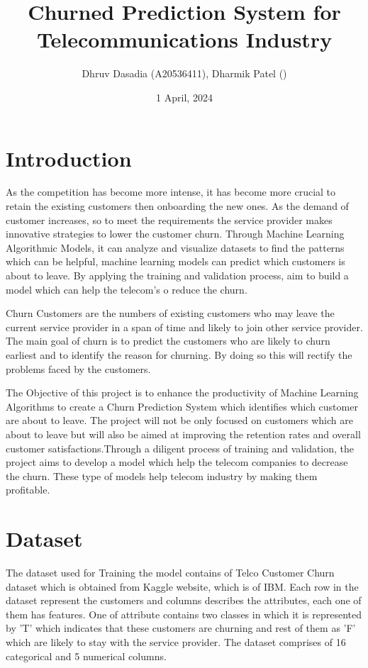 \documentclass{article}
\title{Churned Prediction System for Telecommunications Industry}
\author{Dhruv Dasadia (A20536411), Dharmik Patel ()}
\date{1 April, 2024}
\begin{document}
\maketitle

\section{Introduction}

\title{}

As the competition has become more intense, it has become more crucial to retain the existing customers then onboarding the new ones. As the demand of customer increases, so to meet the requirements the service provider makes innovative strategies to lower the customer churn. Through Machine Learning Algorithmic Models, it can analyze and visualize datasets to find the patterns which can be helpful, machine learning models can predict which customers is about to leave. By applying the training and validation process, aim to build a model which can help the telecom’s o reduce the churn.

Churn Customers are the numbers of existing customers who may leave the current service provider in a span of time and likely to join other service provider. The main goal of churn is to predict the customers who are likely to churn earliest and to identify the reason for churning. By doing so this will rectify the problems faced by the customers.

The Objective of this project is to enhance the productivity of Machine Learning Algorithms to create a Churn Prediction System which identifies which customer are about to leave. The project will not be only focused on customers which are about to leave but will also be aimed at improving the retention rates and overall customer satisfactions.Through a diligent process of training and validation, the project aims to develop a model which help the telecom companies to decrease the churn. These type of models help telecom industry by making them profitable.

\section{Dataset}

The dataset used for Training the model contains of Telco Customer Churn dataset which is obtained from Kaggle website, which is of IBM. Each row in the dataset represent the customers and columns describes the attributes, each one of them has features. One of attribute contains two classes in which it is represented by 'T' which indicates that these customers are churning and rest of them as 'F' which are likely to stay with the service provider. The dataset comprises of 16 categorical and 5 numerical columns.
\end{document}

